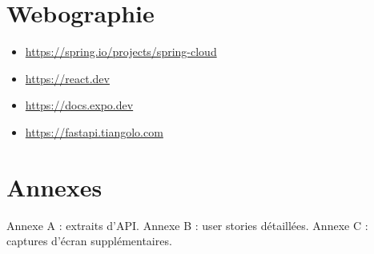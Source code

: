 \documentclass[12pt,a4paper,oneside]{report}
\begin{document}
\chapter*{Webographie}
\begin{itemize}[leftmargin=1.4em]
  \item \url{https://spring.io/projects/spring-cloud}
  \item \url{https://react.dev}
  \item \url{https://docs.expo.dev}
  \item \url{https://fastapi.tiangolo.com}
\end{itemize}

\chapter*{Annexes}
Annexe A : extraits d'API. Annexe B : user stories détaillées. Annexe C : captures d'écran supplémentaires.
\end{document}
